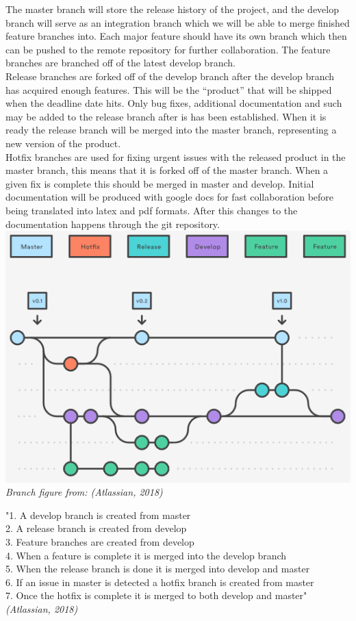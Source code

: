 \documentclass[12pt]{article}%
\begin{document}
The master branch will store the release history of the project, and the develop 		branch will serve as an integration branch which we will be able to merge finished 	feature branches into. Each major feature should have its own branch which then can be pushed to the remote repository for further collaboration. The feature branches are branched off of the latest develop branch. \\
Release branches are forked off of the develop branch after the develop branch has acquired enough features. This will be the “product” that will be shipped when the deadline date hits. Only bug fixes, additional documentation and such may be added to the release branch after is has been established. When it is ready the release branch will be merged into the master branch, representing a new version of the product. \\
Hotfix branches are used for fixing urgent issues with the released product in the master branch, this means that it is forked off of the master branch. When a given fix is complete this should be merged in master and develop.
Initial documentation will be produced with google docs for fast collaboration before being translated into latex and pdf formats. After this changes to the documentation happens through the git repository. \\

\includegraphics[scale=0.8]{image12.png} \\
\textit{Branch figure from: (Atlassian, 2018)}
\vspace{5mm}

\noindent
"1. A develop branch is created from master \\
2. A release branch is created from develop \\
3. Feature branches are created from develop \\
4. When a feature is complete it is merged into the develop branch \\
5. When the release branch is done it is merged into develop and master \\
6. If an issue in master is detected a hotfix branch is created from master \\
7. Once the hotfix is complete it is merged to both develop and master" \\
\textit{(Atlassian, 2018)} \\
\end{document}
